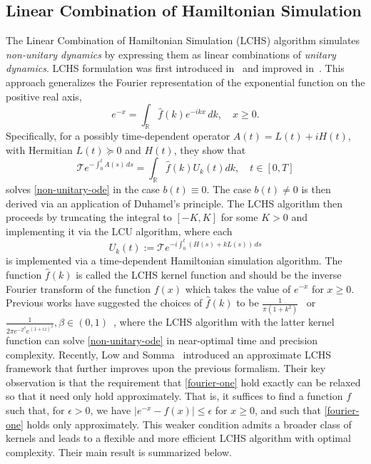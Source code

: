 \documentclass[10pt,reqno]{article}
\numberwithin{equation}{section}
\theoremstyle{plain}
\theoremstyle{definition}
\begin{document}
\subsection{Linear Combination of Hamiltonian Simulation}\label{sec:lchs}
The Linear Combination of Hamiltonian Simulation (LCHS) algorithm simulates \emph{non-unitary dynamics} by expressing them as linear combinations of \emph{unitary dynamics}. 
LCHS formulation was first introduced in~\cite{an2023LCHS} and improved in~\cite{an2023LCHS-Optimal}. 
This approach generalizes the Fourier representation of the exponential function on the positive real axis,
\begin{equation}\label{fourier-one}
e^{-x}=\int_{\mathbb{R}} \hat f(k) e^{-ikx} \, dk,  \quad x \geq 0. 
\end{equation}
Specifically, for a possibly time-dependent operator $A(t) = L(t) + i H(t)$, with Hermitian $L(t) \succeq 0$ and $H(t)$, they show that 
\begin{equation}
\mathcal{T}e^{-\int_0^t A(s)\,ds} =\int_{\mathbb{R}} \hat f(k) U_k(t)dk, \quad t \in [0,T]
\end{equation}
solves \cref{non-unitary-ode} in the case $b(t) \equiv 0$. 
The case $b(t) \neq 0$ is then derived via an application of Duhamel's principle. 
The LCHS algorithm then proceeds by truncating the integral to $[-K,K]$ for some $K > 0$ and implementing it via the LCU algorithm, where each
\begin{equation}\label{Uk}
U_k(t) := \mathcal{T}  e^{-i \int_0^t (H(s) + k L(s)) \, ds}
\end{equation}
is implemented via a time-dependent Hamiltonian simulation algorithm.  The function $\hat f(k)$ is called the LCHS kernel function and should be the inverse Fourier transform of the function $f(x)$ which takes the value of $e^{-x}$ for $x \geq 0$. 
Previous works have suggested the choices of $\hat f(k)$ to be $\frac{1}{\pi(1+k^2)}$~\cite{an2023LCHS} or $\frac{1}{2 \pi e^{-2^\beta} e^{(1+iz)^\beta}}, \beta \in (0,1)$~\cite{an2023LCHS-Optimal}, where the LCHS algorithm with the latter kernel function can solve \cref{non-unitary-ode} in near-optimal time and precision complexity. Recently, Low and Somma~\cite{low2025optimallchs} introduced an approximate LCHS framework that further improves upon the previous formalism. 
Their key observation is that the requirement that \cref{fourier-one} hold exactly can be relaxed so that it need only hold approximately. That is, it suffices to find a function $f$ such that, for $\epsilon > 0$, we have $|e^{-x} - f(x)| \le \epsilon$ for $x \ge 0$, and such that \cref{fourier-one} holds only approximately. 
This weaker condition admits a broader class of kernels and leads to a flexible and more efficient LCHS algorithm with optimal complexity. 
Their main result is summarized below.
\end{document}
